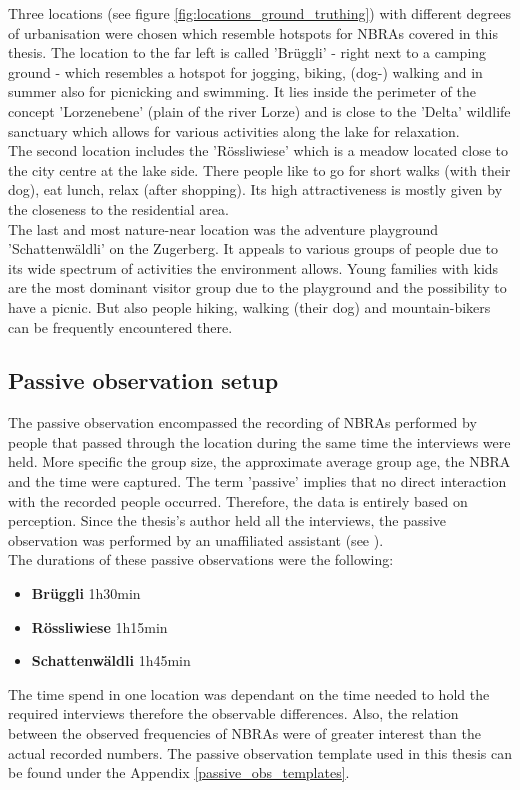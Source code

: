 Three locations (see figure \ref{fig:locations_ground_truthing}) with different degrees of urbanisation were chosen which resemble hotspots for NBRAs covered in this thesis. The location to the far left is called 'Br\"uggli' - right next to a camping ground - which resembles a hotspot for jogging, biking, (dog-) walking and in summer also for picnicking and swimming. It lies inside the perimeter of the concept 'Lorzenebene' (plain of the river Lorze) and is close to the 'Delta' wildlife sanctuary which allows for various activities along the lake for relaxation.\\
The second location includes the 'R\"ossliwiese' which is a meadow located close to the city centre at the lake side. There people like to go for short walks (with their dog), eat lunch, relax (after shopping). Its high attractiveness is mostly given by the closeness to the residential area.\\
The last and most nature-near location was the adventure playground 'Schattenw\"aldli' on the Zugerberg. It appeals to various groups of people due to its wide spectrum of activities the environment allows. Young families with kids are the most dominant visitor group due to the playground and the possibility to have a picnic. But also people hiking, walking (their dog) and mountain-bikers can be frequently encountered there.

\subsection{Passive observation setup} \label{passive_observation_setup}
The passive observation encompassed the recording of NBRAs performed by people that passed through the location during the same time the interviews were held. More specific the group size, the approximate average group age, the NBRA and the time were captured. The term 'passive' implies that no direct interaction with the recorded people occurred. Therefore, the data is entirely based on perception.
Since the thesis's author held all the interviews, the passive observation was performed by an unaffiliated assistant (see ).\\
The durations of these passive observations were the following:
\begin{itemize}
    \item \textbf{Br\"uggli} 1h30min
    \item \textbf{R\"ossliwiese} 1h15min
    \item \textbf{Schattenw\"aldli} 1h45min
\end{itemize}
The time spend in one location was dependant on the time needed to hold the required interviews therefore the observable differences. Also, the relation between the observed frequencies of NBRAs were of greater interest than the actual recorded numbers.
The passive observation template used in this thesis can be found under the Appendix \ref{passive_obs_templates}.

